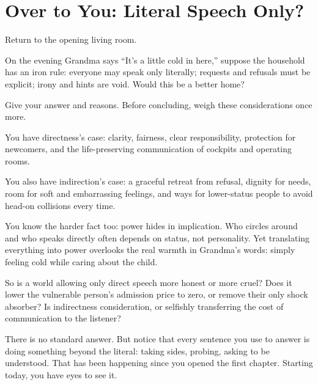 \section{Over to You: Literal Speech Only?}
Return to the opening living room.

On the evening Grandma says ``It's a little cold in here,'' suppose the household has an iron rule: everyone may speak only literally; requests and refusals must be explicit; irony and hints are void. Would this be a better home?

Give your answer and reasons. Before concluding, weigh these considerations once more.

You have directness's case: clarity, fairness, clear responsibility, protection for newcomers, and the life-preserving communication of cockpits and operating rooms.

You also have indirection's case: a graceful retreat from refusal, dignity for needs, room for soft and embarrassing feelings, and ways for lower-status people to avoid head-on collisions every time.

You know the harder fact too: power hides in implication. Who circles around and who speaks directly often depends on status, not personality. Yet translating everything into power overlooks the real warmth in Grandma's words: simply feeling cold while caring about the child.

So is a world allowing only direct speech more honest or more cruel? Does it lower the vulnerable person's admission price to zero, or remove their only shock absorber? Is indirectness consideration, or selfishly transferring the cost of communication to the listener?

There is no standard answer. But notice that every sentence you use to answer is doing something beyond the literal: taking sides, probing, asking to be understood. That has been happening since you opened the first chapter. Starting today, you have eyes to see it.
